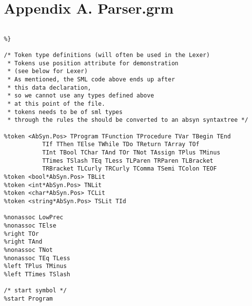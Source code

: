\documentclass[12pt,a4paper,english]{article}
\begin{document}
\section{Appendix A. Parser.grm}
\begin{lstlisting}[caption=The tokens and precedence rules for our grammar in Parser.grm.]
%{ 
   
%}

/* Token type definitions (will often be used in the Lexer)
 * Tokens use position attribute for demonstration 
 * (see below for Lexer)
 * As mentioned, the SML code above ends up after
 * this data declaration,
 * so we cannot use any types defined above
 * at this point of the file.
 * tokens needs to be of sml types
 * through the rules the should be converted to an absyn syntaxtree */

%token <AbSyn.Pos> TProgram TFunction TProcedure TVar TBegin TEnd 
		   TIf TThen TElse TWhile TDo TReturn TArray TOf 
		   TInt TBool TChar TAnd TOr TNot TAssign TPlus TMinus 
		   TTimes TSlash TEq TLess TLParen TRParen TLBracket 
		   TRBracket TLCurly TRCurly TComma TSemi TColon TEOF
%token <bool*AbSyn.Pos> TBLit
%token <int*AbSyn.Pos> TNLit
%token <char*AbSyn.Pos> TCLit
%token <string*AbSyn.Pos> TSLit TId

%nonassoc LowPrec
%nonassoc TElse
%right TOr
%right TAnd
%nonassoc TNot
%nonassoc TEq TLess
%left TPlus TMinus
%left TTimes TSlash

/* start symbol */
%start Program
\end{lstlisting}
\end{document}
